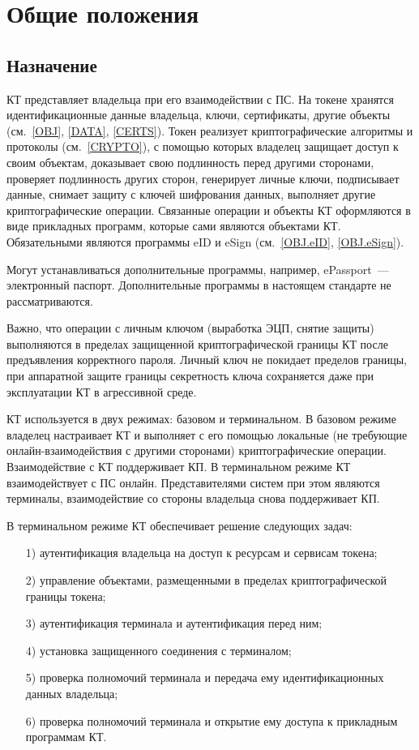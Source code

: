 \chapter{Общие положения}\label{COMMON}

\section{Назначение}

КТ представляет владельца при его взаимодействии с ПС.
На токене хранятся идентификационные данные владельца, ключи, сертификаты, 
другие объекты (см.~\ref{OBJ}, \ref{DATA}, \ref{CERTS}). 
%
Токен реализует криптографические алгоритмы и протоколы (см.~\ref{CRYPTO}), 
с помощью которых владелец защищает доступ к своим объектам, 
доказывает свою подлинность перед другими сторонами, 
проверяет подлинность других сторон, генерирует личные ключи, подписывает 
данные, снимает защиту с ключей шифрования данных, выполняет другие 
криптографические операции.
%
Связанные операции и объекты КТ оформляются в виде прикладных программ,
которые сами являются объектами КТ. Обязательными являются 
программы eID и eSign (см.~\ref{OBJ.eID}, \ref{OBJ.eSign}).

Могут устанавливаться дополнительные программы, например, ePassport~--- 
электронный паспорт. Дополнительные программы в настоящем стандарте не 
рассматриваются.
\fi

Важно, что операции с личным ключом (выработка ЭЦП, снятие защиты) выполняются  
в пределах защищенной криптографической границы КТ после предъявления 
корректного пароля. Личный ключ не покидает пределов границы, при аппаратной 
защите границы секретность ключа сохраняется даже при эксплуатации КТ в 
агрессивной среде.

КТ используется в двух режимах: базовом и терминальном.
%
В базовом режиме владелец настраивает КТ и выполняет с его помощью 
локальные (не требующие онлайн-взаимодействия с другими сторонами) 
криптографические операции. Взаимодействие с КТ поддерживает КП. 
%
В терминальном режиме КТ взаимодействует с ПС онлайн. Представителями систем 
при этом являются терминалы, взаимодействие со стороны владельца снова 
поддерживает КП.

В терминальном режиме КТ обеспечивает решение следующих задач: 
\begin{enumerate}
\item[1)]
аутентификация владельца на доступ к ресурсам и сервисам токена; 
\item[2)]
управление объектами, размещенными в пределах криптографической границы токена;
\item[3)]
аутентификация терминала и аутентификация перед ним;
\item[4)]
установка защищенного соединения с терминалом;
\item[5)]
проверка полномочий терминала и передача ему идентификационных данных владельца;
\item[6)]
проверка полномочий терминала и открытие ему доступа к прикладным программам КТ. 
\end{enumerate}

